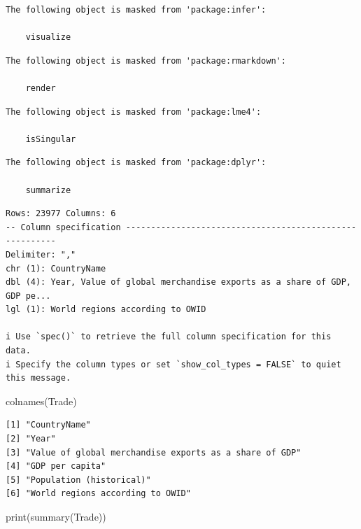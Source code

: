 \documentclass[
  10pt,
]{article}
\newenvironment{Shaded}{\begin{snugshade}}{\end{snugshade}}
\newcommand{\FunctionTok}[1]{\textcolor[rgb]{0.28,0.35,0.67}{#1}}
\newcommand{\NormalTok}[1]{\textcolor[rgb]{0.00,0.23,0.31}{#1}}
\begin{document}
\begin{verbatim}
The following object is masked from 'package:infer':

    visualize
\end{verbatim}

\begin{verbatim}
The following object is masked from 'package:rmarkdown':

    render
\end{verbatim}

\begin{verbatim}
The following object is masked from 'package:lme4':

    isSingular
\end{verbatim}

\begin{verbatim}
The following object is masked from 'package:dplyr':

    summarize
\end{verbatim}

\begin{verbatim}
Rows: 23977 Columns: 6
-- Column specification --------------------------------------------------------
Delimiter: ","
chr (1): CountryName
dbl (4): Year, Value of global merchandise exports as a share of GDP, GDP pe...
lgl (1): World regions according to OWID

i Use `spec()` to retrieve the full column specification for this data.
i Specify the column types or set `show_col_types = FALSE` to quiet this message.
\end{verbatim}

\begin{Shaded}
\begin{Highlighting}[]
\FunctionTok{colnames}\NormalTok{(Trade)}
\end{Highlighting}
\end{Shaded}

\begin{verbatim}
[1] "CountryName"                                          
[2] "Year"                                                 
[3] "Value of global merchandise exports as a share of GDP"
[4] "GDP per capita"                                       
[5] "Population (historical)"                              
[6] "World regions according to OWID"                      
\end{verbatim}

\begin{Shaded}
\begin{Highlighting}[]
\FunctionTok{print}\NormalTok{(}\FunctionTok{summary}\NormalTok{(Trade))}
\end{Highlighting}
\end{Shaded}
\end{document}
